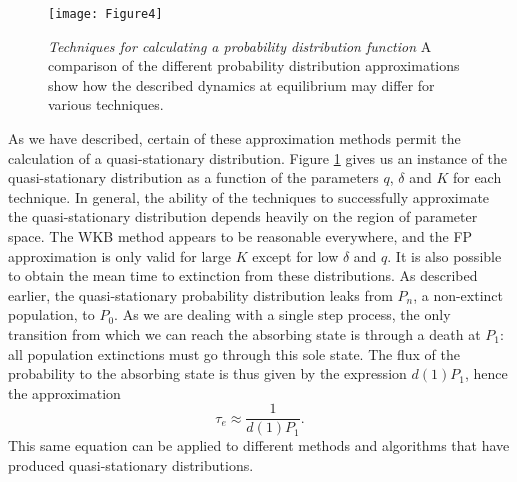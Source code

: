 \documentclass[a4paper,10pt]{article}
\numberwithin{equation}{section} %
\begin{document}
\begin{figure}[ht!]
	\centering
	\texttt{[image: Figure4]}
	\caption{\emph{Techniques for calculating a probability distribution function} A comparison of the different probability distribution approximations show how the described dynamics at equilibrium may differ for various techniques.} \label{pdf_techn}
\end{figure}


As we have described, certain of these approximation methods permit the calculation of a quasi-stationary distribution. 
Figure \ref{pdf_techn} gives us an instance of the quasi-stationary distribution as a function of the parameters $q$, $\delta$ and $K$ for each technique. 
In general, the ability of the techniques to successfully approximate the quasi-stationary distribution depends heavily on the region of parameter space. 
The WKB method appears to be reasonable everywhere, and the FP approximation is only valid for large $K$ except for low $\delta$ and $q$. %
It is also possible to obtain the mean time to extinction from these distributions.
As described earlier, the quasi-stationary probability distribution leaks from $P_n$, a non-extinct population, to $P_0$.
As we are dealing with a single step process, the only transition from which we can reach the absorbing state is through a death at $P_1$: all population extinctions must go through this sole state.
The flux of the probability to the absorbing state is thus given by the expression $d(1)P_1$, hence the approximation \cite{textbooks,WKB paper(Assaf2016?)}
\begin{equation}
\tau_e \approx \frac{1}{d(1)P_1}.
\label{1overd1P1}
\end{equation}
This same equation can be applied to different methods and algorithms that have produced quasi-stationary distributions. %
\end{document}
